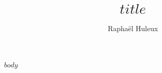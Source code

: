 \documentclass{article}
\title{$title$}
\author{Raphaël Huleux}
\begin{document}
\maketitle

$body$
\end{document}
